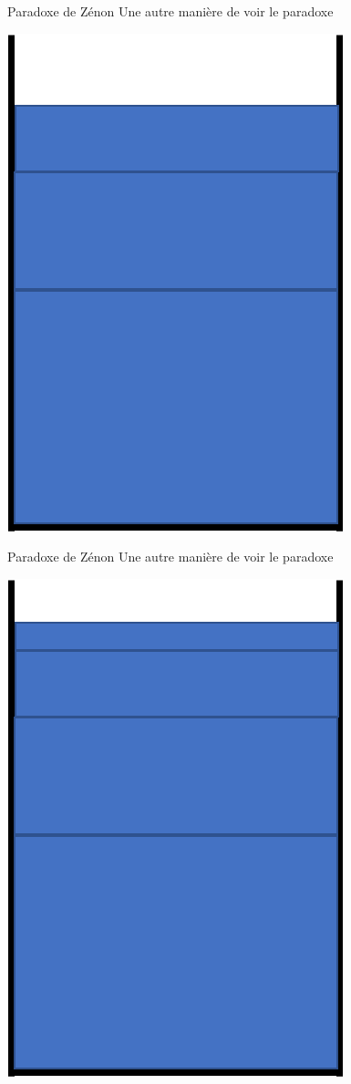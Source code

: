 \documentclass{beamer}
\begin{document}
\begin{frame}{Paradoxe de Zénon}
Une autre manière de voir le paradoxe
\begin{center}
	\includegraphics[scale=0.5]{glass3.png}
\end{center}
\end{frame}
\begin{frame}{Paradoxe de Zénon}
Une autre manière de voir le paradoxe
\begin{center}
	\includegraphics[scale=0.5]{glass4.png}
\end{center}
\end{frame}
\end{document}

